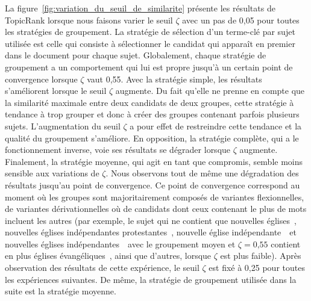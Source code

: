     La figure~\ref{fig:variation_du_seuil_de_similarite} présente les résultats
    de TopicRank lorsque nous faisons varier le seuil $\zeta$ avec un pas de
    0,05 pour toutes les stratégies de groupement. La stratégie de sélection
    d'un terme-clé par sujet utilisée est celle qui consiste à sélectionner le
    candidat qui apparaît en premier dans le document pour chaque sujet.
    Globalement, chaque stratégie de groupement a un comportement qui lui est
    propre jusqu'à un certain point de convergence lorsque $\zeta$ vaut 0,55.
    Avec la stratégie simple, les résultats s'améliorent lorsque le seuil
    $\zeta$ augmente. Du fait qu'elle ne prenne en compte que la similarité
    maximale entre deux candidats de deux groupes, cette stratégie à tendance à
    trop grouper et donc à créer des groupes contenant parfois plusieurs sujets.
    L'augmentation du seuil $\zeta$ a pour effet de restreindre cette tendance
    et la qualité du groupement s'améliore. En opposition, la stratégie
    complète, qui a le fonctionnement inverse, voie ses résultats se dégrader
    lorsque $\zeta$ augmente. Finalement, la stratégie moyenne, qui agit en tant
    que compromis, semble moins sensible aux variations de $\zeta$. Nous
    observons tout de même une dégradation des résultats jusqu'au point de
    convergence. Ce point de convergence correspond au moment où les groupes
    sont majoritairement composés de variantes flexionnelles, de variantes
    dérivationnelles où de candidats dont ceux contenant le plus de mots
    incluent les autres (par exemple, le sujet qui ne contient que \og nouvelles
    églises~\fg, \og nouvelles églises indépendantes protestantes~\fg,
    \og nouvelle église indépendante~\fg\ et \og nouvelles églises
    indépendantes~\fg\ avec le groupement moyen et $\zeta=\text{0,55}$ contient
    en plus \og églises évangéliques~\fg, ainsi que d'autres, lorsque $\zeta$
    est plus faible).
    Après observation des résultats de cette expérience, le seuil $\zeta$ est
    fixé à 0,25 pour toutes les expériences suivantes. De même, la stratégie de
    groupement utilisée dans la suite est la stratégie moyenne.

